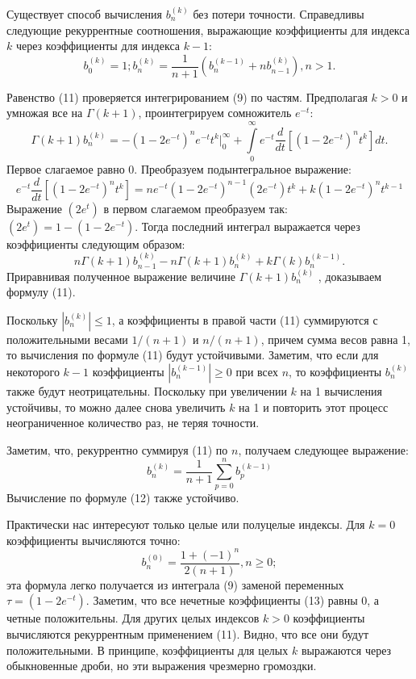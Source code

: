 Существует способ вычисления $b_n^{(k)}$ без потери точности. Справедливы
следующие рекуррентные соотношения, выражающие коэффициенты для
индекса $k$ через коэффициенты для индекса $k-1$:
\begin{equation}
b_0^{(k)}=1;b_n^{(k)}=\frac{1}{n+1}(b_n^{(k-1)}+nb_{n-1}^{(k)}),n>1.
\end{equation}

Равенство (11) проверяется интегрированием (9) по частям. Предполагая
$k > 0$ и умножая все на $\Gamma(k + 1)$, проинтегрируем сомножитель $e^{-t}$:
\begin{equation}
\Gamma(k+1)b_n^{(k)}=-(1-2e^{-t})^ne^{-t}t^k\Big|_0^{\infty} + \int\limits_0^{\infty} e^{-t}\frac{d}{dt}[(1-2e^{-t})^nt^k]dt. 
\end{equation}
Первое слагаемое равно 0. Преобразуем подынтегральное выражение:
\begin{equation}
 e^{-t}\frac{d}{dt}[(1-2e^{-t})^nt^k]=ne^{-t}(1-2e^{-t})^{n-1}(2e^{-t})t^k+k(1-2e^{-t})^nt^{k-1}
\end{equation}
Выражение $(2e^{t})$  в первом слагаемом преобразуем так: $(2e^{t})= 1-(1-2e^{-t})$.
Тогда последний интеграл выражается через коэффициенты следующим
образом:
\begin{equation}
n\Gamma(k+1)b_{n-1}^{(k)}-n\Gamma(k+1)b_n^{(k)}+k\Gamma(k)b_n^{(k-1)}.
\end{equation}
Приравнивая полученное выражение величине $\Gamma{(k+1)}b_n^{(k)}$ , доказываем формулу (11).

Поскольку $|b_n^{(k)}| \leqslant 1$, а коэффициенты в правой части (11) суммируются с
положительными весами $1/(n + 1)$ и $n/(n + 1)$, причем сумма весов равна 1, то
вычисления по формуле (11) будут устойчивыми. Заметим, что если для
некоторого $k - 1$ коэффициенты $|b_n^{(k-1)}| \geqslant 0$ при всех $n$, то коэффициенты $b_n^{(k)}$ также будут неотрицательны. Поскольку при увеличении $k$ на 1 вычисления
устойчивы, то можно далее снова увеличить $k$ на 1 и повторить этот процесс
неограниченное количество раз, не теряя точности.

Заметим, что, рекуррентно суммируя (11) по $n$, получаем следующее выражение:
\begin{equation}
b_n^{(k)}=\frac{1}{n+1}\sum\limits_{p=0}^n b_p^{(k-1)}
\end{equation}
Вычисление по формуле (12) также устойчиво.

Практически нас интересуют только целые или полуцелые индексы. Для
$k = 0$ коэффициенты вычисляются точно:
\begin{equation}
b_n^{(0)}=\frac{1+(-1)^n}{2(n+1)},n \geqslant 0;
\end{equation}
эта формула легко получается из интеграла (9) заменой переменных
$\tau = (1 - 2e^{-t})$. Заметим, что все нечетные коэффициенты (13) равны 0, а четные
положительны. Для других целых индексов $k > 0$ коэффициенты вычисляются
рекуррентным применением (11). Видно, что все они будут положительными. В
принципе, коэффициенты для целых $k$ выражаются через обыкновенные дроби,
но эти выражения чрезмерно громоздки.


